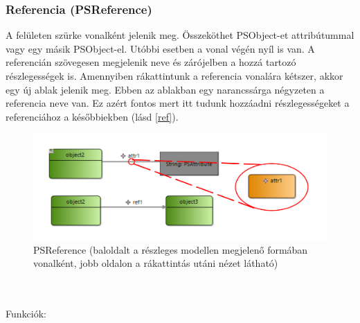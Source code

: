 \subsubsection{Referencia (PSReference)}
A felületen szürke vonalként jelenik meg. Összeköthet PSObject-et attribútummal vagy egy másik PSObject-el. Utóbbi esetben a vonal végén nyíl is van. A referencián szövegesen megjelenik neve és zárójelben a hozzá tartozó részlegességek is. Amennyiben rákattintunk a referencia vonalára kétszer, akkor egy új ablak jelenik meg. Ebben az ablakban egy narancssárga négyzeten a referencia neve van. Ez azért fontos mert itt tudunk hozzáadni részlegességeket a referenciához a későbbiekben (lásd \autoref{ref}).
\begin{figure}[!ht]
	\centering
	\includegraphics[scale = 0.3]{figures/ref.pdf}
	\caption{PSReference (baloldalt a részleges modellen megjelenő formában vonalként, jobb oldalon a rákattintás utáni nézet látható)}
	\label{ref} 
\end{figure}
\\\\
Funkciók:
